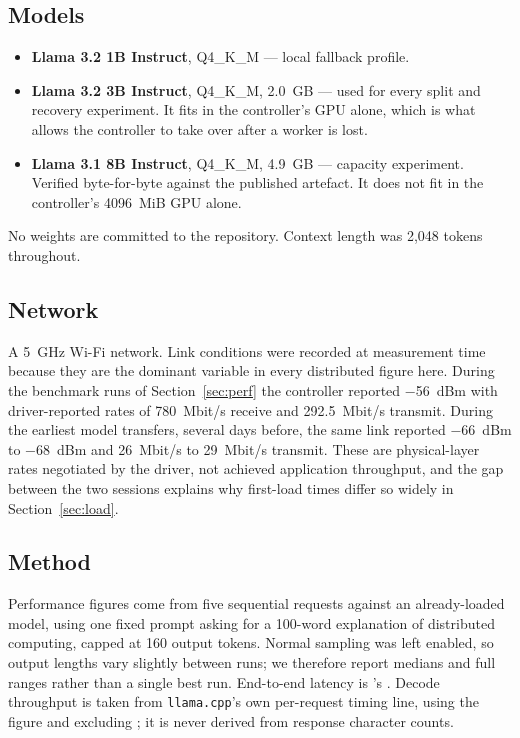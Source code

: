 \subsection{Models}

\begin{itemize}[leftmargin=1.4em,itemsep=2pt]
  \item \textbf{Llama 3.2 1B Instruct}, Q4\_K\_M --- local fallback profile.
  \item \textbf{Llama 3.2 3B Instruct}, Q4\_K\_M, \SI{2.0}{GB} --- used for every
        split and recovery experiment. It fits in the controller's GPU alone,
        which is what allows the controller to take over after a worker is lost.
  \item \textbf{Llama 3.1 8B Instruct}, Q4\_K\_M, \SI{4.9}{GB} --- capacity
        experiment. Verified byte-for-byte against the published artefact. It
        does not fit in the controller's \SI{4096}{MiB} GPU alone.
\end{itemize}

No weights are committed to the repository. Context length was 2{,}048 tokens
throughout.

\subsection{Network}

A \SI{5}{GHz} Wi-Fi network. Link conditions were recorded at measurement time
because they are the dominant variable in every distributed figure here. During
the benchmark runs of Section~\ref{sec:perf} the controller reported
\SI{-56}{dBm} with driver-reported rates of \SI{780}{Mbit/s} receive and
\SI{292.5}{Mbit/s} transmit. During the earliest model transfers, several days
before, the same link reported \SI{-66}{dBm} to \SI{-68}{dBm} and
\SI{26}{Mbit/s} to \SI{29}{Mbit/s} transmit. These are physical-layer rates
negotiated by the driver, not achieved application throughput, and the gap
between the two sessions explains why first-load times differ so widely in
Section~\ref{sec:load}.

\subsection{Method}

Performance figures come from five sequential requests against an
already-loaded model, using one fixed prompt asking for a 100-word explanation
of distributed computing, capped at 160 output tokens. Normal sampling was left
enabled, so output lengths vary slightly between runs; we therefore report
medians and full ranges rather than a single best run. End-to-end latency is
's . Decode throughput is taken from
\texttt{llama.cpp}'s own per-request timing line, using the 
figure and excluding ; it is never derived from response
character counts.


